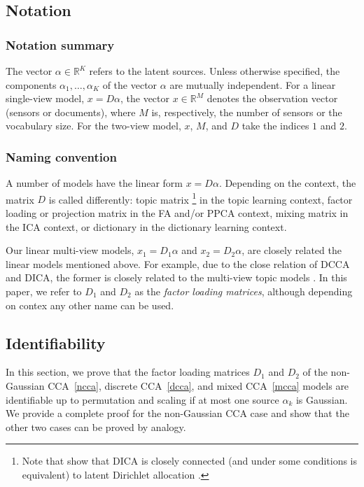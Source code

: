 \documentclass{article}
\newcommand{\R}{\mathbb{R}}
\begin{document}
\subsection{Notation}
\label{app:notation}

\subsubsection{Notation summary}
\label{app:notation-summary}
The vector $\alpha\in\R^K$ refers to the latent sources. Unless otherwise specified, the components $\alpha_1,\dots,\alpha_K$ of the vector $\alpha$ are mutually independent. For a linear single-view model, $x=D\alpha$, the vector $x\in\R^M$ denotes the observation vector (sensors or documents), where $M$ is, respectively, the number of sensors or the vocabulary size. For the two-view model, $x$, $M$, and $D$ take the indices $1$ and $2$.

\subsubsection{Naming convention}
\label{app:naming_convention}
A number of models have the linear form $x=D\alpha$.
Depending on the context, the matrix $D$ is called differently:   topic matrix%
\footnote{ Note that \citet{PodEtAl2015} show that DICA is closely connected (and under some conditions is equivalent) to latent Dirichlet allocation \citep{BleEtAl2003}. 
} 
in the topic learning context,
factor loading or projection matrix in the FA and/or PPCA context,  mixing matrix in the ICA context, or  dictionary in the dictionary learning context. 

Our linear multi-view models, $x_1 = D_1\alpha$ and $x_2 = D_2\alpha$, are closely related the linear models mentioned above.
For example, due to the close relation of DCCA and DICA, the former is closely related to the multi-view topic models .
In this paper, we refer to $D_1$ and $D_2$ as the  \emph{factor loading matrices}, although depending on contex any other name can be used.




\subsection{Identifiability}
\label{app:identifiability}
In this section, we prove that the factor loading matrices $D_1$ and $D_2$ of the non-Gaussian CCA~\eqref{ncca}, discrete CCA~\eqref{dcca}, and mixed CCA~\eqref{mcca} models are identifiable up to permutation and scaling if at most one source $\alpha_k$ is Gaussian.
We provide a complete proof for the non-Gaussian CCA case and show that the other two cases can be proved by analogy.
\end{document}
